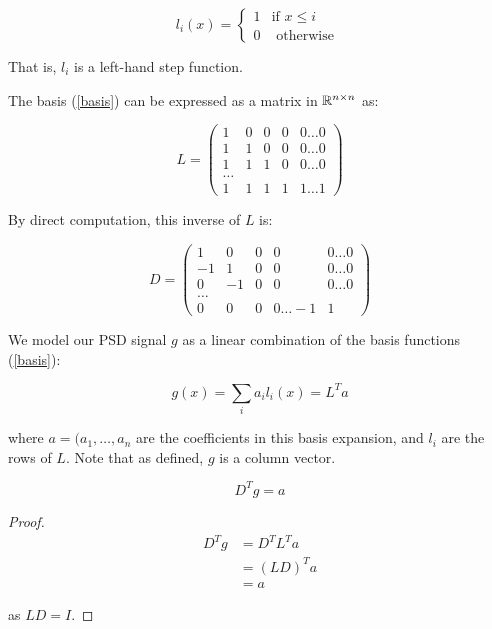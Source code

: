 \begin{equation}
l_i\left(x\right) =
\begin{cases}
1 & \text{if } x \leq i \\
0 & \text{ otherwise } 
\end{cases}
\label{basis}
\end{equation}

That is, \(l_i\) is a left-hand step function. 

The basis (\ref{basis}) can be expressed as a matrix in \({\mathbb{R}}^{n \times n}\) as:

\begin{equation}
L = \begin{pmatrix}
 1 & 0 & 0 & 0  & 0 \ldots 0 \\
  1 & 1 & 0 & 0  & 0 \ldots 0\\
     1 & 1 & 1 & 0  & 0 \ldots0  \\
    \ldots  \\
     1 & 1 & 1 & 1  & 1 \ldots 1 
\end{pmatrix}
\end{equation}

By direct computation, this inverse of \(L\) is:

\begin{equation}
D = \begin{pmatrix}
 1 & 0 & 0 & 0  & 0 \ldots 0 \\
  -1 & 1 & 0 & 0  & 0 \ldots 0\\
     0 & -1 & 0 & 0  & 0 \ldots0  \\
    \ldots  \\
     0 & 0 & 0 & 0  \ldots -1 & 1
\end{pmatrix}
\end{equation}

We model our PSD signal \(g\) as a linear combination of the basis functions (\ref{basis}):

\begin{equation}
g\left(x\right) = \sum_i a_i l_i\left(x\right) = L^Ta
\label{basis-expansion}
\end{equation}

where \(a = (a_1, \ldots, a_n\) are the coefficients in this basis expansion, and \(l_i\) are the rows of \(L\). Note that as defined, \(g\) is a column vector.

\begin{proposition}
\begin{equation}
D^Tg = a
\end{equation}
\label{def:a}
\end{proposition}
\begin{proof}

\begin{align}
D^Tg &= D^T L^T a \\
&= \left(LD\right)^Ta \\
&= a
\end{align}

as \(LD = I\).

\end{proof}

